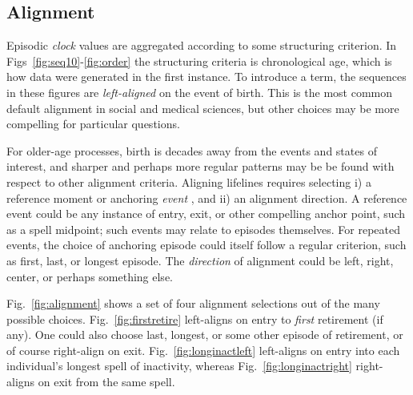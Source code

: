 \documentclass[a4paper,left=1.25cm,right=1.25cm,top=1.25cm,bottom=1.25cm]{article}
\begin{document}
\FloatBarrier
\subsection{Alignment}
\label{sec:align}
Episodic \emph{clock} values are aggregated according to some structuring criterion. In Figs~\ref{fig:seq10}-\ref{fig:order} the structuring criteria is chronological age, which is how data were generated in the first instance. To introduce a term, the sequences in these figures are \emph{left-aligned} on the event of birth. This is the most common default alignment in social and medical sciences, but other choices may be more compelling for particular questions.

For older-age processes, birth is decades away from the events and states of interest, and sharper and perhaps more regular patterns may be be found with respect to other alignment criteria. Aligning lifelines requires selecting i) a reference moment or anchoring \emph{event} , and ii) an alignment direction. A reference event could be any instance of entry, exit, or other compelling anchor point, such as a spell midpoint; such events may relate to episodes themselves. For repeated events, the choice of anchoring episode could itself follow a regular criterion, such as first, last, or longest episode. The \emph{direction} of alignment could be left, right, center, or perhaps something else.

Fig.~\ref{fig:alignment} shows a set of four alignment selections out of the
many possible choices. Fig.~\ref{fig:firstretire} left-aligns on
entry to \emph{first} retirement (if any). One could also choose last, longest,
or some other episode of retirement, or of course right-align on exit.
Fig.~\ref{fig:longinactleft} left-aligns on entry into each individual's
longest spell of inactivity, whereas Fig.~\ref{fig:longinactright} right-aligns on exit from
the same spell.
\end{document}
